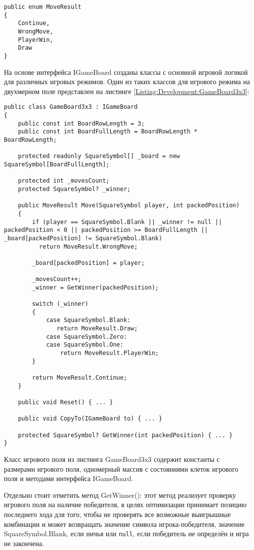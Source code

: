 \begin{lstlisting}[caption={Перечисление с результатом хода на игровом поле}]
public enum MoveResult
{
    Continue,
    WrongMove,
    PlayerWin,
    Draw
}
\end{lstlisting}

На основе интерфейса IGameBoard созданы классы с основной игровой логикой для различных игровых режимов. Один из таких классов для игрового режима на двухмерном поле представлен на листинге \ref{Listing:Development:GameBoard3x3}:

\begin{lstlisting}[caption={Класс игрового поля три на три клетки}, label=Listing:Development:GameBoard3x3]
public class GameBoard3x3 : IGameBoard
{
    public const int BoardRowLength = 3;
    public const int BoardFullLength = BoardRowLength * BoardRowLength;

    protected readonly SquareSymbol[] _board = new SquareSymbol[BoardFullLength];

    protected int _movesCount;
    protected SquareSymbol? _winner;

    public MoveResult Move(SquareSymbol player, int packedPosition)
    {
        if (player == SquareSymbol.Blank || _winner != null || packedPosition < 0 || packedPosition >= BoardFullLength || _board[packedPosition] != SquareSymbol.Blank)
          return MoveResult.WrongMove;

        _board[packedPosition] = player;

        _movesCount++;
        _winner = GetWinner(packedPosition);

        switch (_winner)
        {
            case SquareSymbol.Blank:
               return MoveResult.Draw;
            case SquareSymbol.Zero:
            case SquareSymbol.One:
                return MoveResult.PlayerWin;
        }

        return MoveResult.Continue;
    }

    public void Reset() { ... }

    public void CopyTo(IGameBoard to) { ... }

    protected SquareSymbol? GetWinner(int packedPosition) { ... }
}
\end{lstlisting}

Класс игрового поля из листинга GameBoard3x3 содержит константы с размерами игрового поля, одномерный массив с состояниями клеток игрового поля и методами интерфейса IGameBoard.

Отдельно стоит отметить метод GetWinner(): этот метод реализует проверку игрового поля на наличие победителя, в целях оптимизации принимает позицию последнего хода для того, чтобы не проверять все возможные выигрышные комбинации и может возвращать значение символа игрока-победителя, значение SquareSymbol.Blank, если ничья или \lstinline{null}, если победитель не определён и игра не закончена.

